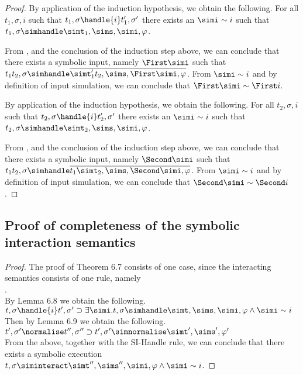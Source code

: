 \begin{proof}
    {
    By application of the induction hypothesis, we obtain the following.
    For all $t_1,\sigma,i$ such that $t_1,\sigma\handle{i}t_1',\sigma'$ there exists an $\simi\sim i$ such that $t_1,\sigma\simhandle \simt_1,\sims,\simi,\phi$.

    From , and the conclusion of the induction step above,
    we can conclude that there exists a symbolic input, namely $\First \simi$ such that $t_1\And t_2,\sigma\simhandle\overline{\simt_1'\And t_2,\sims,\First\simi,\phi}$.
    From $\simi\sim i$ and by definition of input simulation, we can conclude that $\First \simi\sim \First i$.
    }

    {
    By application of the induction hypothesis, we obtain the following.
    For all $t_2,\sigma,i$ such that $t_2,\sigma\handle{i}t_2',\sigma'$ there exists an $\simi\sim i$ such that $t_2,\sigma\simhandle \simt_2,\sims,\simi,\phi$.

    From , and the conclusion of the induction step above,
    we can conclude that there exists a symbolic input, namely $\Second \simi$ such that $t_1\And t_2,\sigma\simhandle \overline{t_1\And \simt_2,\sims,\Second\simi,\phi}$.
    From $\simi\sim i$ and by definition of input simulation, we can conclude that $\Second \simi\sim \Second i$.
    }


\end{proof}

\subsection{Proof of completeness of the symbolic interaction semantics}

\begin{proof} The proof of Theorem 6.7 consists of one case, since
  the interacting semantics consists of one rule, namely\\
  .\\
  By Lemma 6.8 we obtain the following.
  $t,\sigma\handle{i} t',\sigma'\implies \exists \simi . t,\sigma\simhandle \simt,\sims,\simi,\phi \land \simi\sim i$\\
  Then by Lemma 6.9 we obtain the following.
  $t',\sigma'\normalise t'',\sigma''\implies t',\sigma'\simnormalise \simt',\sims',\phi'$\\
  From the above, together with the SI-Handle rule, we can conclude that there exists a symbolic execution $t,\sigma\siminteract \simt'',\sims'',\simi,\phi\land \simi\sim i$.

\end{proof}
